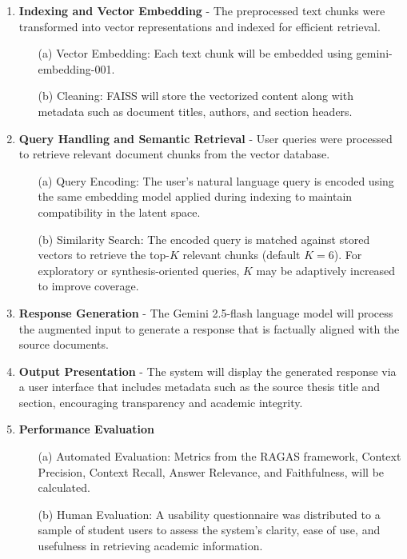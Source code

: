 \begin{refsection}
\begin{enumerate}
    \item \textbf{Indexing and Vector Embedding} - The preprocessed text chunks were transformed into vector representations and indexed for efficient retrieval.
        \begin{enumerate}
            \item [(a)] {Vector Embedding:} Each text chunk will be embedded using gemini-embedding-001.
            \item [(b)] {Cleaning:} FAISS will store the vectorized content along with metadata such as document titles, authors, and section headers.
        \end{enumerate}

    \item \textbf{Query Handling and Semantic Retrieval} - User queries were processed to retrieve relevant document chunks from the vector database.
        \begin{enumerate}
            \item [(a)] {Query Encoding:} The user’s natural language query is encoded using the same embedding model applied during indexing to maintain compatibility in the latent space.
            \item [(b)] {Similarity Search:} The encoded query is matched against stored vectors to retrieve the top-$K$ relevant chunks (default $K=6$). For exploratory or synthesis-oriented queries, $K$ may be adaptively increased to improve coverage.
        \end{enumerate}

    \item \textbf{Response Generation} - The Gemini 2.5-flash language model will process the augmented input to generate a response that is factually aligned with the source documents.

    \item \textbf{Output Presentation} - The system will display the generated response via a user interface that includes metadata such as the source thesis title and section, encouraging transparency and academic integrity.

    \item \textbf{Performance Evaluation}
        \begin{enumerate}
            \item [(a)] {Automated Evaluation:} Metrics from the RAGAS framework, Context Precision, Context Recall, Answer Relevance, and Faithfulness, will be calculated.
            \item [(b)] {Human Evaluation:} A usability questionnaire was distributed to a sample of student users to assess the system’s clarity, ease of use, and usefulness in retrieving academic information.
        \end{enumerate}


\end{enumerate}
\end{refsection}

